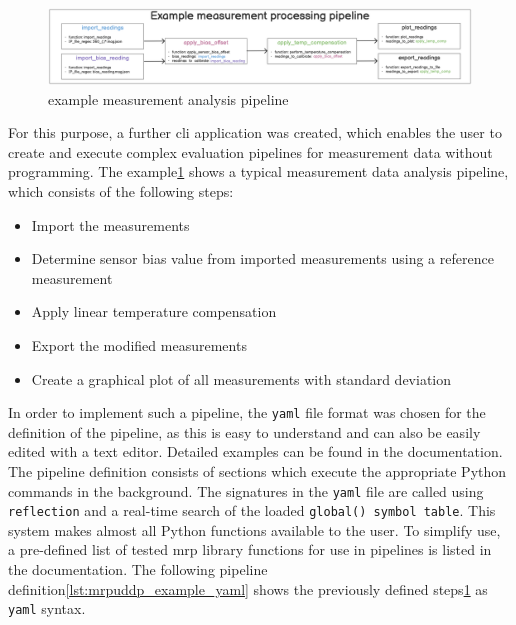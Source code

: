 \begin{figure}
\centering
\includegraphics{./generated_images/border_example_measurement_analysis_pipeline.png}
\caption{example measurement analysis pipeline
\label{example_measurement_analysis_pipeline.png}}
\end{figure}

For this purpose, a further \gls{cli} application was created, which
enables the user to create and execute complex evaluation pipelines for
measurement data without programming. The
example\ref{example_measurement_analysis_pipeline.png} shows a typical
measurement data analysis pipeline, which consists of the following
steps:

\begin{itemize}
\tightlist
\item
  Import the measurements
\item
  Determine sensor bias value from imported measurements using a
  reference measurement
\item
  Apply linear temperature compensation
\item
  Export the modified measurements
\item
  Create a graphical plot of all measurements with standard deviation
\end{itemize}

In order to implement such a pipeline, the
\passthrough{\lstinline!yaml!} file format was chosen for the definition
of the pipeline, as this is easy to understand and can also be easily
edited with a text editor. Detailed examples can be found in the
documentation\cite{MagneticReadoutProcessingReadTheDocs}. The
pipeline definition consists of sections which execute the appropriate
Python commands in the background. The signatures in the
\passthrough{\lstinline!yaml!} file are called using
\passthrough{\lstinline!reflection!} and a real-time search of the
loaded
\passthrough{\lstinline!global() symbol table!}\cite{PythonGlobalSymbolTable}.
This system makes almost all Python functions available to the user. To
simplify use, a pre-defined list of tested \gls{mrp} library functions
for use in pipelines is listed in the
documentation\cite{MagneticReadoutProcessingReadTheDocs}. The
following pipeline definition\ref{lst:mrpuddp_example_yaml} shows the
previously defined steps\ref{example_measurement_analysis_pipeline.png}
as \passthrough{\lstinline!yaml!} syntax.

